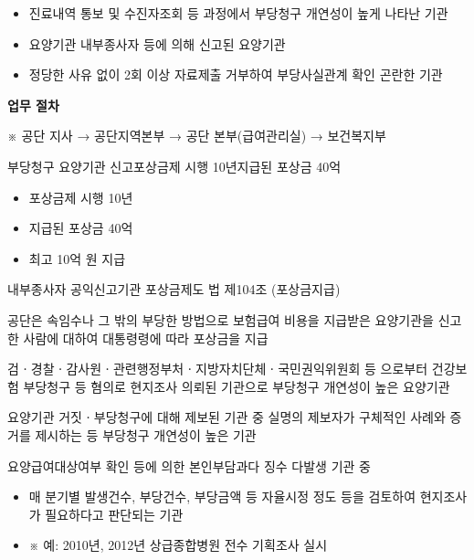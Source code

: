\begin{itemize}\tightlist
\item 진료내역 통보 및 수진자조회 등 과정에서 부당청구 개연성이 높게 나타난 기관
\item 요양기관 내부종사자 등에 의해 신고된 요양기관
\item 정당한 사유 없이 2회 이상 자료제출 거부하여 부당사실관계 확인 곤란한 기관
\end{itemize}
\textbf{업무 절차}\par
{}\par 
{}\par 


※ 공단 지사 → 공단지역본부 → 공단 본부(급여관리실) → 보건복지부\par \medskip

부당청구 요양기관 신고포상금제 시행 10년\cntrdots{}지급된 포상금 40억
\begin{itemize}\tightlist
\item 포상금제 시행 10년
\item 지급된 포상금 40억
\item 최고 10억 원 지급
\end{itemize}

\begin{commentbox}{내부종사자 공익신고기관 포상금제도}
법 제104조 (포상금지급)\par
공단은 속임수나 그 밖의 부당한 방법으로 보험급여 비용을 지급받은 요양기관을 신고한 사람에 대하여 대통령령에 따라 포상금을 지급
\end{commentbox}

검ㆍ경찰ㆍ감사원ㆍ관련행정부처ㆍ지방자치단체ㆍ국민권익위원회 등 으로부터 건강보험 부당청구 등 혐의로 현지조사 의뢰된 기관으로 부당청구 개연성이 높은 요양기관 \par

요양기관 거짓ㆍ부당청구에 대해 제보된 기관 중 실명의 제보자가 구체적인 사례와 증거를 제시하는 등 부당청구 개연성이 높은 기관 \par

요양급여대상여부 확인 등에 의한 본인부담과다 징수 다발생 기관 중 \par
\begin{itemize}\tightlist
\item 매 분기별 발생건수, 부당건수, 부당금액 등 자율시정 정도 등을 검토하여 현지조사가 필요하다고 판단되는 기관
\item ※ 예: 2010년, 2012년 상급종합병원 전수 기획조사 실시
\end{itemize}


